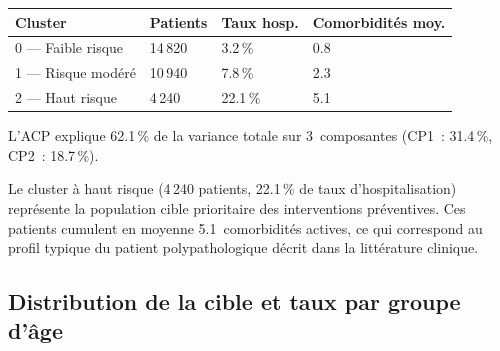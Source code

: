 \begin{resultatbox}
\begin{tabular}{@{}llll@{}}
\toprule
\textbf{Cluster} & \textbf{Patients} & \textbf{Taux hosp.} & \textbf{Comorbidités moy.} \\
\midrule
0 — Faible risque   & 14\,820 & 3.2\,\%  & 0.8 \\
1 — Risque modéré   & 10\,940 & 7.8\,\%  & 2.3 \\
2 — Haut risque     &  4\,240 & 22.1\,\% & 5.1 \\
\bottomrule
\end{tabular}

\vspace{0.5em}
L'ACP explique 62.1\,\% de la variance totale sur 3~composantes
(CP1~: 31.4\,\%, CP2~: 18.7\,\%).
\end{resultatbox}

Le cluster à haut risque (4\,240 patients, 22.1\,\% de taux d'hospitalisation)
représente la population cible prioritaire des interventions préventives. Ces patients
cumulent en moyenne 5.1~comorbidités actives, ce qui correspond au profil typique du
patient polypathologique décrit dans la littérature clinique.


\subsection{Distribution de la cible et taux par groupe d'âge}

